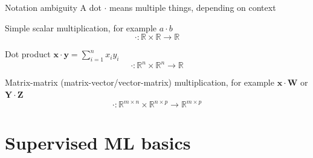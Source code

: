 \documentclass[12pt,aspectratio=169,handout]{beamer}
\begin{document}
\begin{frame}{Notation ambiguity}
A dot $\cdot$ means multiple things, depending on context
	
Simple scalar multiplication, for example $a \cdot b$
$$\cdot : \mathbb{R} \times \mathbb{R} \to \mathbb{R}$$

Dot product $\mathbf{x} \cdot \mathbf{y} = \sum_{i = 1}^{n} x_i y_i$
$$\cdot : \mathbb{R}^n \times \mathbb{R}^n \to \mathbb{R}$$

Matrix-matrix (matrix-vector/vector-matrix) multiplication, for example $\mathbf{x} \cdot \mathbf{W}$ or $\mathbf{Y} \cdot \mathbf{Z}$
$$\cdot : \mathbb{R}^{m \times n} \times \mathbb{R}^{n \times p} \to \mathbb{R}^{m \times p}$$
	
\end{frame}

%	
%
%
%	



\section{Supervised ML basics}

%	
%
%
%	
%	


%
%
%
%
%
%
\end{document}

